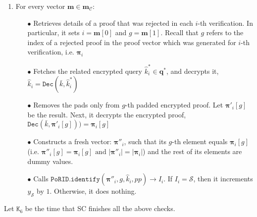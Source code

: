 \begin{enumerate}
\begin{enumerate}
\begin{enumerate}
\item\label{the-contract-loop2} For every  vector $ {\bm{m}}\in {\bm{m}}_{\scriptscriptstyle \mathcal{C}}$:
\begin{itemize}
\item[$\bullet$]  Retrieves details of a proof that was rejected in each $i$-th verification.  In particular, it sets   $i= {\bm{m}}[0]$ and $g= {\bm{m}}[1]$. Recall that $g$ refers to the index of a rejected proof in the proof vector which was generated for $i$-th verification, i.e. $ {\bm{\pi}}_{\scriptscriptstyle i}$ 


\item[$\bullet$]  Fetches the related encrypted query $\hat{k}^{\scriptscriptstyle *}_{\scriptscriptstyle i}\in \bm{q}^{\scriptscriptstyle *}$, and   decrypts it, $\hat{k}_{\scriptscriptstyle i}=\mathtt{Dec}(\bar{k},\hat{k}^{\scriptscriptstyle *}_{\scriptscriptstyle i})$


\item[$\bullet$]  Removes the pads only from $g$-th padded encrypted proof. Let $ {\bm{\pi}}'_{\scriptscriptstyle i}[g]$ be the result. Next, it decrypts the  encrypted proof, $\mathtt{Dec}(\bar{k}, {\bm{\pi}}'_{\scriptscriptstyle i}[g]))= {\bm{\pi}}_{\scriptscriptstyle i}[g]$

\item[$\bullet$] \label{dummy-vector2} Constructs a fresh vector: $ {\bm{\pi}}''_{\scriptscriptstyle i}$, such that  its $g$-th element equals $ {\bm{\pi}}_{\scriptscriptstyle i}[g]$ (i.e. $ {\bm{\pi}}''_{\scriptscriptstyle i}[g]=  {\bm{\pi}}_{\scriptscriptstyle i}[g] \text{ and } | {\bm{\pi}}''_{\scriptscriptstyle i}|= | {\bm{\pi}}_{\scriptscriptstyle i}|$) and the rest of its elements are dummy values. 

\item[$\bullet$] Calls   $\mathtt{PoRID.identify}( {\bm{\pi}}''_{\scriptscriptstyle i},g,\hat{k}_{\scriptscriptstyle i},pp)\rightarrow I_{\scriptscriptstyle i}$. If $I_{\scriptscriptstyle i}=\mathcal S$, then it increments $y_{\scriptscriptstyle\mathcal S}$  by $1$. Otherwise, it does nothing. 

\end{itemize}
\end{enumerate}
Let $\texttt{K}_{\scriptscriptstyle 6}$ be the time that SC finishes all the above checks.%

\end{enumerate} %

\


\end{enumerate}
